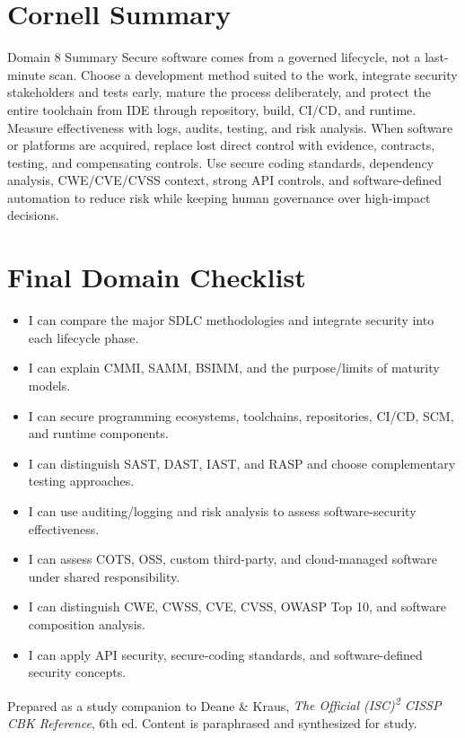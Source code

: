 \documentclass[10pt,letterpaper]{article}
\begin{document}
\section{\color{navy}Cornell Summary}
\begin{summarybox}{Domain 8 Summary}
Secure software comes from a governed lifecycle, not a last-minute scan. Choose a development method suited to the work, integrate security stakeholders and tests early, mature the process deliberately, and protect the entire toolchain from IDE through repository, build, CI/CD, and runtime. Measure effectiveness with logs, audits, testing, and risk analysis. When software or platforms are acquired, replace lost direct control with evidence, contracts, testing, and compensating controls. Use secure coding standards, dependency analysis, CWE/CVE/CVSS context, strong API controls, and software-defined automation to reduce risk while keeping human governance over high-impact decisions.
\end{summarybox}

\section{\color{navy}Final Domain Checklist}
{\small
\begin{itemize}[label=\(\square\),nosep]
\item I can compare the major SDLC methodologies and integrate security into each lifecycle phase.
\item I can explain CMMI, SAMM, BSIMM, and the purpose/limits of maturity models.
\item I can secure programming ecosystems, toolchains, repositories, CI/CD, SCM, and runtime components.
\item I can distinguish SAST, DAST, IAST, and RASP and choose complementary testing approaches.
\item I can use auditing/logging and risk analysis to assess software-security effectiveness.
\item I can assess COTS, OSS, custom third-party, and cloud-managed software under shared responsibility.
\item I can distinguish CWE, CWSS, CVE, CVSS, OWASP Top 10, and software composition analysis.
\item I can apply API security, secure-coding standards, and software-defined security concepts.
\end{itemize}
}
\vfill{\footnotesize\color{teal}Prepared as a study companion to Deane \& Kraus, \textit{The Official (ISC)\textsuperscript{2} CISSP CBK Reference}, 6th ed. Content is paraphrased and synthesized for study.}
\end{document}
